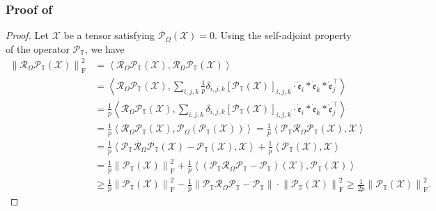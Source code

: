 \documentclass[twoside,12pt]{article}
\def\fro{{\mathrm{F}}}
\def\fro{{\mathrm{F}}}
\def\dme{{\dot{\mathfrak{e}}}}
\def\mrme{{\mathring{\mathfrak{e}}}}
\begin{document}
\subsubsection{\textnormal{Proof of }}
\begin{proof}
Let $\mathcal{X}$ be a tensor satisfying $\mathcal{P}_{\Omega}(\mathcal{X}) = 0$.
Using the self-adjoint property of the operator $\mathcal{P}_{\mathbb{T}}$, we have 
\begin{align*}
\left\|\mathcal{R}_{\Omega}\mathcal{P}_{\mathbb{T}}(\mathcal{X})\right\|_{\fro}^2 
& = \left\langle \mathcal{R}_{\Omega}\mathcal{P}_{\mathbb{T}}(\mathcal{X}),\mathcal{R}_{\Omega}\mathcal{P}_{\mathbb{T}}(\mathcal{X})\right\rangle \\
& = \left\langle \mathcal{R}_{\Omega}\mathcal{P}_{\mathbb{T}}(\mathcal{X}),\sum\limits_{i,j,k}\frac{1}{p}\delta_{i,j,k}[\mathcal{P}_{\mathbb{T}}(\mathcal{X})]_{i,j,k}\cdot\mrme_i * \dme_k * \mrme_j^{\top}\right\rangle \\ 
& = \frac{1}{p}\left\langle \mathcal{R}_{\Omega}\mathcal{P}_{\mathbb{T}}(\mathcal{X}),\sum\limits_{i,j,k}\delta_{i,j,k}[\mathcal{P}_{\mathbb{T}}(\mathcal{X})]_{i,j,k}\cdot\mrme_i * \dme_k * \mrme_j^{\top}\right\rangle \\ 
& = \frac{1}{p}\left\langle \mathcal{R}_{\Omega}\mathcal{P}_{\mathbb{T}}(\mathcal{X}),\mathcal{P}_{\Omega}(\mathcal{P}_{\mathbb{T}}(\mathcal{X}))\right\rangle=\frac{1}{p} \left\langle \mathcal{P}_{\mathbb{T}}\mathcal{R}_{\Omega}\mathcal{P}_{\mathbb{T}}(\mathcal{X}),\mathcal{X}\right\rangle \\
& = \frac{1}{p}\left\langle \mathcal{P}_{\mathbb{T}}\mathcal{R}_{\Omega}\mathcal{P}_{\mathbb{T}}(\mathcal{X})-\mathcal{P}_{\mathbb{T}}(\mathcal{X}),\mathcal{X}\right\rangle +  \frac{1}{p}\left\langle \mathcal{P}_{\mathbb{T}}(\mathcal{X}),\mathcal{X}\right\rangle\\
&=\frac{1}{p}\left\|\mathcal{P}_{\mathbb{T}}(\mathcal{X})\right\|_{\fro}^2+\frac{1}{p}\left\langle \left(\mathcal{P}_{\mathbb{T}}\mathcal{R}_{\Omega}\mathcal{P}_{\mathbb{T}}-\mathcal{P}_{\mathbb{T}}\right)(\mathcal{X}),\mathcal{P}_{\mathbb{T}}(\mathcal{X})\right\rangle\\
&\geq \frac{1}{p}\left\|\mathcal{P}_{\mathbb{T}}(\mathcal{X})\right\|_{\fro}^2-\frac{1}{p}\left\|\mathcal{P}_{\mathbb{T}}\mathcal{R}_{\Omega}\mathcal{P}_{\mathbb{T}}-\mathcal{P}_{\mathbb{T}}\right\|\cdot\left\|\mathcal{P}_{\mathbb{T}}(\mathcal{X})\right\|_{\fro}^2\geq \frac{1}{2p}\left\|\mathcal{P}_{\mathbb{T}}(\mathcal{X})\right\|_{\fro}^2.

\end{align*}
\end{proof}
\end{document}
